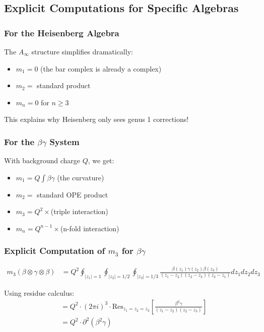 \subsection{Explicit Computations for Specific Algebras}

\subsubsection{For the Heisenberg Algebra}

The $A_\infty$ structure simplifies dramatically:
\begin{itemize}
\item $m_1 = 0$ (the bar complex is already a complex)
\item $m_2 = $ standard product
\item $m_n = 0$ for $n \geq 3$
\end{itemize}

This explains why Heisenberg only sees genus 1 corrections!

\subsubsection{For the $\beta\gamma$ System}

With background charge $Q$, we get:
\begin{itemize}
\item $m_1 = Q \int \beta\gamma$ (the curvature)
\item $m_2 = $ standard OPE product
\item $m_3 = Q^2 \times $(triple interaction)
\item $m_n = Q^{n-1} \times $(n-fold interaction)
\end{itemize}

\subsubsection{Explicit Computation of $m_3$ for $\beta\gamma$}

\begin{align}
m_3(\beta \otimes \gamma \otimes \beta) &= Q^2 \oint_{|z_1|=1} \oint_{|z_2|=1/2} \oint_{|z_3|=1/3} \frac{\beta(z_1)\gamma(z_2)\beta(z_3)}{(z_1-z_2)(z_2-z_3)(z_3-z_1)} dz_1 dz_2 dz_3
\end{align}

Using residue calculus:
\begin{align}
&= Q^2 \cdot (2\pi i)^3 \cdot \text{Res}_{z_1=z_2=z_3}\left[\frac{\beta^2\gamma}{(z_1-z_2)(z_2-z_3)}\right] \\
&= Q^2 \cdot \partial^2(\beta^2\gamma)
\end{align}

